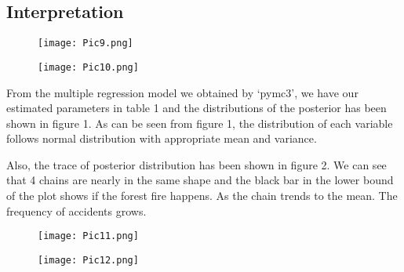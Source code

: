 \documentclass[12pt]{article}
\theoremstyle{plain}
\begin{document}
\begin{spacing}{1}
\begin{flushleft}
 \section{Interpretation}
 
 
 \vspace{2.0mm}
 
      \begin{figure}[htp]
 	\centering  
 	\texttt{[image: Pic9.png]}
 	\label{fig:figure1label}
 \end{figure}
 
 
 
       \begin{figure}[htp]
 	\centering  
 	\texttt{[image: Pic10.png]}
 	\label{fig:figure1label}
 \end{figure}
 
 \vspace{2.0mm}
 
 From the multiple regression model we obtained by `pymc3', we have our estimated parameters in table 1 and the distributions of the posterior has been shown in figure 1. As can be seen from figure 1, the distribution of each variable follows normal distribution with appropriate mean and variance.
 
 \vspace{2.0mm}
 
 Also, the trace of posterior distribution has been shown in figure 2. We can see that 4 chains are nearly in the same shape and the black bar in the lower bound of the plot shows if the forest fire happens. As the chain trends to the mean. The frequency of accidents grows.
 
 \vspace{2.0mm}
 
       \begin{figure}[htp]
 	\centering  
 	\texttt{[image: Pic11.png]}
 	\label{fig:figure1label}
 \end{figure}


\vspace{2.0mm}

 
       \begin{figure}[htp]
 	\centering  
 	\texttt{[image: Pic12.png]}
 	\label{fig:figure1label}
 \end{figure}
 
 \vspace{2.0mm}
 

\end{flushleft}
\end{spacing}
\end{document}
